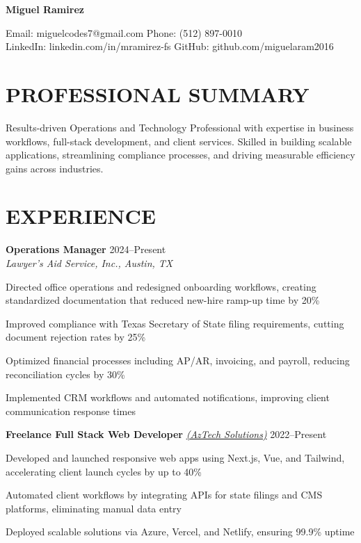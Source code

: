 \documentclass[11pt]{article}
\begin{document}
\textbf{\LARGE Miguel Ramirez}

Email: miguelcodes7@gmail.com \quad Phone: (512) 897-0010 \\
LinkedIn: linkedin.com/in/mramirez-fs \quad GitHub: github.com/miguelaram2016

\section*{PROFESSIONAL SUMMARY}
Results-driven Operations and Technology Professional with expertise in business workflows, full-stack development, and client services. Skilled in building scalable applications, streamlining compliance processes, and driving measurable efficiency gains across industries.

\section*{EXPERIENCE}

\textbf{Operations Manager} \hfill 2024--Present \\
\textit{Lawyer's Aid Service, Inc., Austin, TX}
\begin{compactitem}
  \item Directed office operations and redesigned onboarding workflows, creating standardized documentation that reduced new-hire ramp-up time by 20\%
  \item Improved compliance with Texas Secretary of State filing requirements, cutting document rejection rates by 25\%
  \item Optimized financial processes including AP/AR, invoicing, and payroll, reducing reconciliation cycles by 30\%
  \item Implemented CRM workflows and automated notifications, improving client communication response times
\end{compactitem}

\textbf{Freelance Full Stack Web Developer} \href{https://aztech-solutions.dev}{\textit{(AzTech Solutions)}} \hfill 2022--Present
\begin{compactitem}
  \item Developed and launched responsive web apps using Next.js, Vue, and Tailwind, accelerating client launch cycles by up to 40\%
  \item Automated client workflows by integrating APIs for state filings and CMS platforms, eliminating manual data entry
  \item Deployed scalable solutions via Azure, Vercel, and Netlify, ensuring 99.9\% uptime
\end{compactitem}
\end{document}
